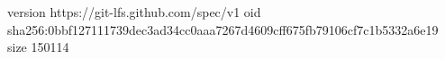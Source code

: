 version https://git-lfs.github.com/spec/v1
oid sha256:0bbf127111739dec3ad34cc0aaa7267d4609cff675fb79106cf7c1b5332a6e19
size 150114
